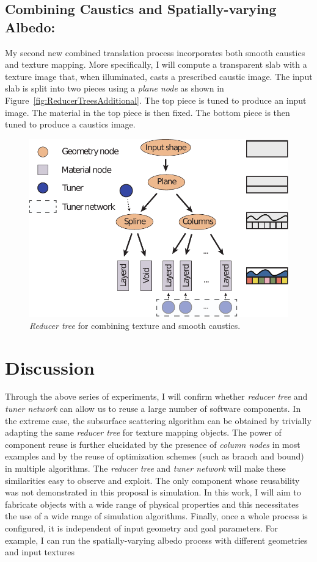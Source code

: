 \section{Combining Caustics and Spatially-varying Albedo:}
My second new combined translation process incorporates both smooth caustics and texture mapping.
More specifically, I will compute a transparent slab with a texture image that, when illuminated, casts a prescribed caustic image.
The input slab is split into two pieces using a \emph{plane node} as shown in Figure~\ref{fig:ReducerTreesAdditional}.
The top piece is tuned to produce an input image. The material in the top piece is then fixed. The bottom piece is then tuned to produce a caustics image.
\begin{figure}
\centering
\includegraphics[scale=0.7]{figure/treeTexSpline.pdf}
\caption {\emph{Reducer tree} for combining texture and smooth caustics.
}
\label{fig:treeDeform}
\end{figure}

\chapter{Discussion}
Through the above series of experiments, I will confirm whether \emph{reducer tree} and \emph{tuner network} can allow us to reuse a large number of software components.
In the extreme case, the subsurface scattering algorithm can be obtained by trivially adapting the same \emph{reducer tree} for texture mapping objects.
The power of component reuse is further elucidated by the presence of \emph{column nodes} in most examples and by the reuse of optimization schemes (such as branch and bound) in multiple algorithms.
The \emph{reducer tree} and \emph{tuner network} will make these similarities easy to observe and exploit.
The only component whose reusability was not demonstrated in this proposal is simulation.
In this work, I will aim to fabricate objects with a wide range of physical properties and this necessitates the use of a wide range of simulation algorithms. Finally, once a whole process is configured, it is independent of input geometry and goal parameters. For example, I can run the spatially-varying albedo process with different geometries and input textures


